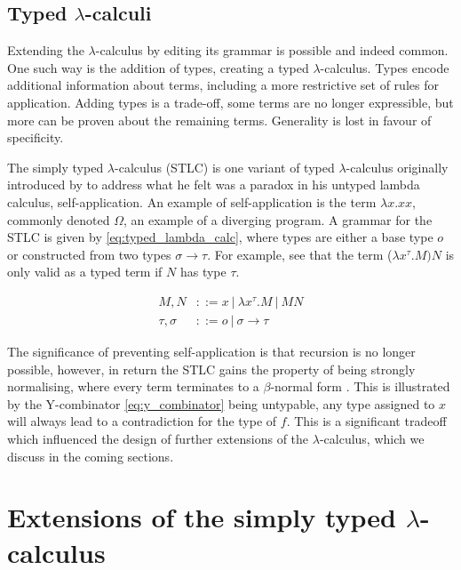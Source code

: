 \documentclass[12pt,a4paper]{report}
\theoremstyle{definition}
\theoremstyle{definition}
\theoremstyle{remark}
\begin{document}
\subsection{Typed \texorpdfstring{$\lambda$}{lambda}-calculi}
Extending the $\lambda$-calculus by editing its grammar is possible and indeed common. One such way is the addition of types, creating a typed $\lambda$-calculus. Types encode additional information about terms, including a more restrictive set of rules for application. Adding types is a trade-off, some terms are no longer expressible, but more can be proven about the remaining terms. Generality is lost in favour of specificity.

The simply typed $\lambda$-calculus (STLC) is one variant of typed $\lambda$-calculus originally introduced by \cite{church_1940} to address what he felt was a paradox in his untyped lambda calculus, self-application. An example of self-application is the term $\lambda x.xx$, commonly denoted $\Omega$, an example of a diverging program. A grammar for the STLC is given by \eqref{eq:typed_lambda_calc}, where types are either a base type $o$ or constructed from two types $\sigma \rightarrow \tau$. For example, see that the term ($\lambda x^{\tau}.M)N$ is only valid as a typed term if $N$ has type $\tau$.

\begin{equation} \label{eq:typed_lambda_calc}
\begin{split}
    M,N &::=x\ |\ \lambda x^{\tau} .M\ |\ MN\\
    \tau , \sigma &::= o\ |\ \sigma \rightarrow \tau
\end{split}
\end{equation}

The significance of preventing self-application is that recursion is no longer possible, however, in return the STLC gains the property of being strongly normalising, where every term terminates to a $\beta$-normal form \citep{tait_1967}. This is illustrated by the Y-combinator \eqref{eq:y_combinator} being untypable, any type assigned to $x$ will always lead to a contradiction for the type of $f$. This is a significant tradeoff which influenced the design of further extensions of the $\lambda$-calculus, which we discuss in the coming sections.

\section{Extensions of the simply typed \texorpdfstring{$\lambda$}{lambda}-calculus}
\end{document}
